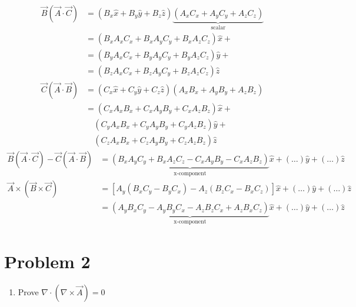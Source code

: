 \documentclass[12pt]{article}
\begin{document}
\begin{align*}
	\vec{B} (\vec{A} \cdot \vec{C}) & = (B_x \hat{x} + B_y \hat{y} + B_z \hat{z}) \underbrace{(A_x C_x + A_y C_y + A_z C_z)}_{\text{scalar}} \\
	                                & = (B_x A_x C_x + B_x A_y C_y + B_x A_z C_z )\hat{x} +                                                  \\
	                                & = (B_y A_x C_x + B_y A_y C_y + B_y A_z C_z )\hat{y} +                                                  \\
	                                & = (B_z A_x C_x + B_z A_y C_y + B_z A_z C_z )\hat{z}                                                    
\end{align*}
\begin{align*}
	\vec{C} (\vec{A} \cdot \vec{B}) & = (C_x \hat{x} + C_y \hat{y} + C_z \hat{z}) (A_x B_x + A_y B_y + A_z B_z) \\
	                                & = (C_x A_x B_x + C_x A_y B_y + C_x A_z B_z )\hat{x} +                     \\
	                                & \quad (C_y A_x B_x + C_y A_y B_y + C_y A_z B_z )\hat{y} +                 \\
	                                & \quad (C_z A_x B_x + C_z A_y B_y + C_z A_z B_z )\hat{z}                   
\end{align*}
\begin{align*}
    \vec{B} (\vec{A} \cdot \vec{C}) - \vec{C} (\vec{A} \cdot \vec{B}) & = \underbrace{(B_x A_y C_y + B_x A_z C_z - C_x A_y B_y - C_x A_z B_z)}_{\text{x-component}}\hat{x} + (\dots) \hat{y} + (\dots) \hat{z}\\
    \vec{A} \times (\vec{B} \times \vec{C})                            & =[A_y(B_x C_y - B_y C_x) - A_z(B_z C_x - B_x C_z)]\hat{x} + (\dots) \hat{y} + (\dots) \hat{z}\\
    &= \underbrace{(A_y B_x C_y - A_y B_y C_x - A_z B_z C_x + A_z B_x C_z)}_{\text{x-component}}\hat{x} + (\dots) \hat{y} + (\dots) \hat{z}                                                                                                                                
\end{align*}

\section*{Problem 2}
\begin{enumerate}
    \item Prove \(\nabla \cdot (\nabla \times \vec{A}) = 0 \)
\end{enumerate}
\end{document}
